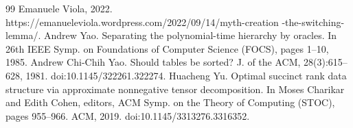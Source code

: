 \begin{thebibliography}{99}
 Emanuele Viola, 2022. https://emanueleviola.wordpress.com/2022/09/14/myth-creation -the-switching-lemma/.
 Andrew Yao. Separating the polynomial-time hierarchy by oracles. In 26th IEEE Symp. on Foundations of Computer Science (FOCS), pages 1–10, 1985.
 Andrew Chi-Chih Yao. Should tables be sorted? J. of the ACM, 28(3):615–628, 1981. doi:10.1145/322261.322274.
 Huacheng Yu. Optimal succinct rank data structure via approximate nonnegative tensor decomposition. In Moses Charikar and Edith Cohen, editors, ACM Symp. on the Theory of Computing (STOC), pages 955–966. ACM, 2019. doi:10.1145/3313276.3316352.
\end{thebibliography}
